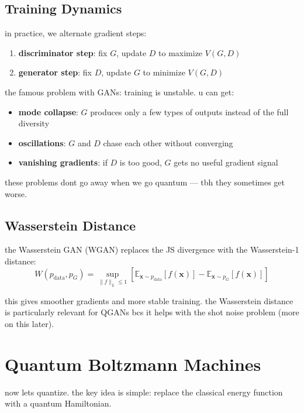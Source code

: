 \documentclass[11pt,a4paper]{article}
\theoremstyle{definition}
\theoremstyle{remark}
\begin{document}
\subsection{Training Dynamics}

in practice, we alternate gradient steps:
\begin{enumerate}[label=\arabic*.]
    \item \textbf{discriminator step}: fix $G$, update $D$ to maximize $V(G, D)$
    \item \textbf{generator step}: fix $D$, update $G$ to minimize $V(G, D)$
\end{enumerate}

the famous problem with GANs: training is unstable. u can get:
\begin{itemize}[nosep]
    \item \textbf{mode collapse}: $G$ produces only a few types of outputs instead of the full diversity
    \item \textbf{oscillations}: $G$ and $D$ chase each other without converging
    \item \textbf{vanishing gradients}: if $D$ is too good, $G$ gets no useful gradient signal
\end{itemize}

these problems dont go away when we go quantum --- tbh they sometimes get worse.

\subsection{Wasserstein Distance}

the Wasserstein GAN (WGAN) replaces the JS divergence with the Wasserstein-1 distance:
\[
W(p_{\text{data}}, p_G) = \sup_{\|f\|_L \leq 1} \left[ \mathbb{E}_{\mathbf{x} \sim p_{\text{data}}}[f(\mathbf{x})] - \mathbb{E}_{\mathbf{x} \sim p_G}[f(\mathbf{x})] \right]
\]

this gives smoother gradients and more stable training. the Wasserstein distance is particularly relevant for QGANs bcs it helps with the shot noise problem (more on this later).

\section{Quantum Boltzmann Machines}

now lets quantize. the key idea is simple: replace the classical energy function with a quantum Hamiltonian.
\end{document}
